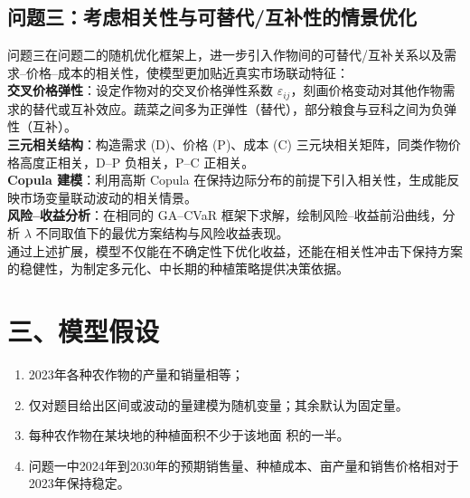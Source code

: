 \documentclass[12pt]{article}
\begin{document}
\subsection{问题三：考虑相关性与可替代/互补性的情景优化}
问题三在问题二的随机优化框架上，进一步引入作物间的可替代/互补关系以及需求–价格–成本的相关性，使模型更加贴近真实市场联动特征：\\
\textbf{交叉价格弹性}：设定作物对的交叉价格弹性系数 $\varepsilon_{ij}$，刻画价格变动对其他作物需求的替代或互补效应。蔬菜之间多为正弹性（替代），部分粮食与豆科之间为负弹性（互补）。\\
\textbf{三元相关结构}：构造需求 (D)、价格 (P)、成本 (C) 三元块相关矩阵，同类作物价格高度正相关，D–P 负相关，P–C 正相关。\\
\textbf{Copula 建模}：利用高斯 Copula \cite{xia2024}在保持边际分布的前提下引入相关性，生成能反映市场变量联动波动的相关情景。\\
\textbf{风险–收益分析}：在相同的 GA–CVaR 框架下求解，绘制风险–收益前沿曲线，分析 $\lambda$ 不同取值下的最优方案结构与风险收益表现。\\
通过上述扩展，模型不仅能在不确定性下优化收益，还能在相关性冲击下保持方案的稳健性，为制定多元化、中长期的种植策略提供决策依据。

\section{三、模型假设}
\begin{enumerate}[itemsep=1pt]
    \item 2023年各种农作物的产量和销量相等；  
    \item 仅对题目给出区间或波动的量建模为随机变量；其余默认为固定量。  
    \item 每种农作物在某块地的种植面积不少于该地面 积的一半。  
    \item 问题一中2024年到2030年的预期销售量、种植成本、亩产量和销售价格相对于2023年保持稳定。  
\end{enumerate}
\end{document}
